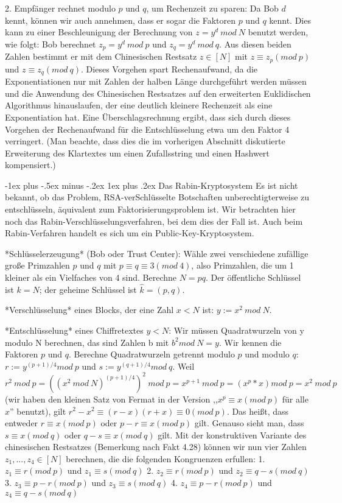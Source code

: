 \documentclass[a4paper]{article}
\makeatletter
\renewcommand{\subsubsection}{\@startsection{subsubsection}{3}{0mm}%
 {-1ex plus -.5ex minus -.2ex}%
 {1ex plus .2ex}%
 {\normalfont\small\bfseries}}
\makeatother
\begin{document}
\begin{multicols}{3}
        2. Empfänger rechnet modulo $p$ und $q$, um Rechenzeit zu sparen: Da Bob $d$ kennt, können wir auch annehmen, dass er sogar die Faktoren $p$ und $q$ kennt. Dies kann zu einer Beschleunigung der Berechnung von $z=y^d\ mod\ N$ benutzt werden, wie folgt: Bob berechnet $z_p=y^d\ mod\ p$ und $z_q=y^d\ mod\ q$. Aus diesen beiden Zahlen bestimmt er mit dem Chinesischen Restsatz $z\in [N]$ mit $z\equiv z_p (mod\ p)$ und $z\equiv z_q(mod\ q)$. Dieses Vorgehen spart Rechenaufwand, da die Exponentiationen nur mit Zahlen der halben Länge durchgeführt werden müssen und die Anwendung des Chinesischen Restsatzes auf den erweiterten Euklidischen Algorithmus hinauslaufen, der eine deutlich kleinere Rechenzeit als eine Exponentiation hat.
        Eine Überschlagsrechnung ergibt, dass sich durch dieses Vorgehen der Rechenaufwand für die Entschlüsselung etwa um den Faktor 4 verringert. (Man beachte, dass dies die im vorherigen Abschnitt diskutierte Erweiterung des Klartextes um einen Zufallsstring und einen Hashwert kompensiert.)

        \subsubsection{Das Rabin-Kryptosystem}
        Es ist nicht bekannt, ob das Problem, RSA-verSchlüsselte Botschaften unberechtigterweise zu entschlüsseln, äquivalent zum Faktorisierungsproblem ist. Wir betrachten hier noch das Rabin-Verschlüsselungsverfahren, bei dem dies der Fall ist. Auch beim Rabin-Verfahren handelt es sich um ein Public-Key-Kryptosystem.

        *Schlüsselerzeugung* (Bob oder Trust Center): Wähle zwei verschiedene zufällige große Primzahlen $p$ und $q$ mit $p\equiv q\equiv 3 (mod\ 4)$, also Primzahlen, die um 1 kleiner als ein Vielfaches von 4 sind. Berechne $N=pq$. Der öffentliche Schlüssel ist $k=N$; der geheime Schlüssel ist $\hat{k}= (p,q)$.

        *Verschlüsselung* eines Blocks, der eine Zahl $x<N$ ist: $y:=x^2\ mod\ N$.

        *Entschlüsselung* eines Chiffretextes $y<N$: Wir müssen Quadratwurzeln von y modulo N berechnen, das sind Zahlen b mit $b^2 mod\ N=y$. Wir kennen die Faktoren $p$ und $q$. Berechne Quadratwurzeln getrennt modulo $p$ und modulo $q$: $r:=y^{(p+1)/4} mod\ p$ und $s:=y^{(q+1)/4} mod\ q$.
        Weil $r^2\ mod\ p =((x^2\ mod\ N)^{(p+1)/4})^2\ mod\ p=x^{p+1}\ mod\ p=(x^p *x) mod\ p = x^2\ mod\ p$ (wir haben den kleinen Satz von Fermat in der Version ,,$x^p\equiv x(mod\ p)$ für alle $x$'' benutzt), gilt $r^2-x^2\equiv (r-x)(r+x)\equiv 0 (mod\ p)$. Das heißt, dass entweder $r\equiv x(mod\ p)$ oder $p-r\equiv x(mod\ p)$ gilt.
        Genauso sieht man, dass $s\equiv x(mod\ q)$ oder $q-s\equiv x(mod\ q)$ gilt.
        Mit der konstruktiven Variante des chinesischen Restsatzes (Bemerkung nach Fakt 4.28) können wir nun vier Zahlen $z_1,...,z_4 \in [N]$ berechnen, die die folgenden Kongruenzen erfullen:
        1. $z_1 \equiv r (mod\ p)$ und $z_1 \equiv s (mod\ q)$
        2. $z_2 \equiv r (mod\ p)$ und $z_2 \equiv q-s (mod\ q)$
        3. $z_3 \equiv p-r (mod\ p)$ und $z_3 \equiv s (mod\ q)$
        4. $z_4 \equiv p-r (mod\ p)$ und $z_4 \equiv q-s (mod\ q)$


\end{multicols}
\end{document}
